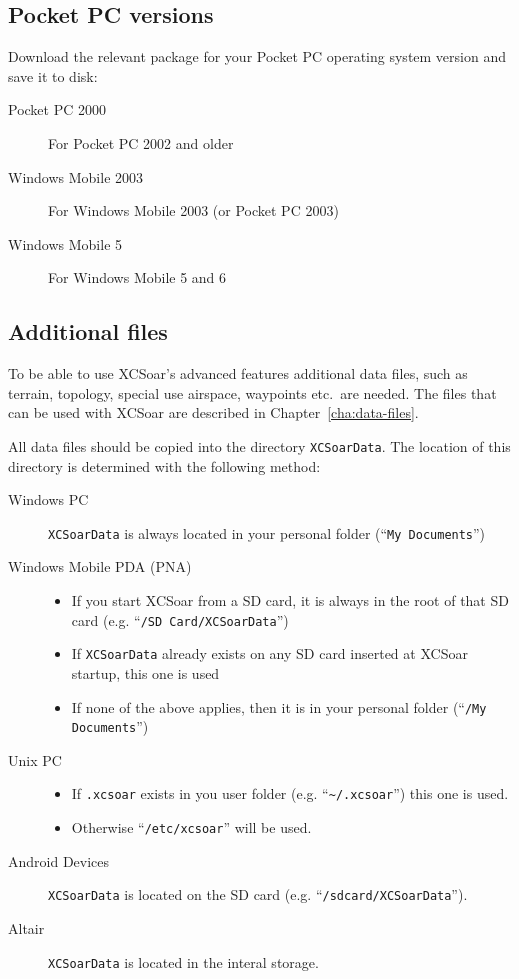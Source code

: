 \documentclass[a4paper,12pt]{refrep}
\begin{document}
\subsection*{Pocket PC versions}
Download the relevant package for your Pocket PC operating system
version and save it to disk:
\begin{description}
\item[Pocket PC 2000] For Pocket PC 2002 and older
\item[Windows Mobile 2003] For Windows Mobile 2003 (or Pocket PC 2003)
\item[Windows Mobile 5] For Windows Mobile 5 and 6
\end{description}

\subsection*{Additional files}
To be able to use XCSoar's advanced features additional data files, such as
terrain, topology, special use airspace, waypoints etc.\ are needed. The files
that can be used with XCSoar are described in Chapter~\ref{cha:data-files}.

All data files should be copied into the directory \texttt{XCSoarData}. The
location of this directory is determined with the following method:

\begin{description}
\item[Windows PC]
\texttt{XCSoarData} is always located in your personal folder (``\texttt{My
Documents}'')
\item[Windows Mobile PDA (PNA)]
\begin{itemize}
\item If you start XCSoar from a SD card, it is always in the root of
  that SD card (e.g. ``\texttt{/SD Card/XCSoarData}'')
\item If \texttt{XCSoarData} already exists on any SD card inserted
  at XCSoar start\-up, this one is used
\item If none of the above applies, then it is in your personal folder
  (``\texttt{/My Documents}'')
\end{itemize}
\item[Unix PC]
\begin{itemize}
\item If \texttt{.xcsoar} exists in you user folder (e.g.
``\texttt{\~{}/.xcsoar}'') this one is used.
\item Otherwise ``\texttt{/etc/xcsoar}'' will be used.
\end{itemize}
\item[Android Devices]
\texttt{XCSoarData} is located on the SD card (e.g.
``\texttt{/sdcard/XCSoarData}'').
\item[Altair]
\texttt{XCSoarData} is located in the interal storage.
\end{description}
\end{document}
